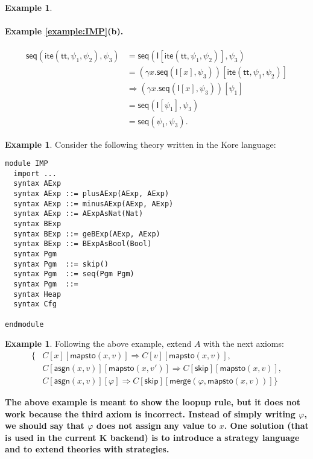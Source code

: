\documentclass[UTF8]{article}
\newcommand{\comment}[1]
    {\par {\bfseries \color{blue} #1 \par}} %
\newcounter{thmcounter}
\theoremstyle{plain}
\theoremstyle{definition}
\newtheorem{example}[thmcounter]{Example}
\theoremstyle{remark}
\newcommand{\impite}{\mathsf{ite}}
\newcommand{\imptt}{\mathsf{tt}}
\newcommand{\impskip}{\mathsf{skip}}
\newcommand{\impseq}{\mathsf{seq}}
\newcommand{\impasgn}{\mathsf{asgn}}
\newcommand{\impmapsto}{\mathsf{mapsto}}
\newcommand{\impmerge}{\mathsf{merge}}
\newcommand{\I}{\mathsf{I}}
\begin{document}
\begin{example}
\paragraph{Example \ref{example:IMP}(b).} 
	\begin{align*}
	\impseq(\impite(\imptt, \psi_1, \psi_2), \psi_3) 
	&= \impseq(\I[\impite(\imptt, \psi_1, \psi_2)], \psi_3) \\
	&= (\gamma x . \impseq(\I[x], \psi_3))[\impite(\imptt, \psi_1, \psi_2)] \\
	&\Rightarrow (\gamma x . \impseq(\I[x], \psi_3))[\psi_1] \\
	&= \impseq(\I[\psi_1], \psi_3) \\
	&= \impseq(\psi_1, \psi_3).
	\end{align*}
\end{example}

\begin{example}
Consider the following theory written in the Kore language:
\begin{Verbatim}
module IMP
  import ...
  syntax AExp
  syntax AExp ::= plusAExp(AExp, AExp)
  syntax AExp ::= minusAExp(AExp, AExp)
  syntax AExp ::= AExpAsNat(Nat)
  syntax BExp
  syntax BExp ::= geBExp(AExp, AExp)
  syntax BExp ::= BExpAsBool(Bool)
  syntax Pgm
  syntax Pgm  ::= skip()
  syntax Pgm  ::= seq(Pgm Pgm)
  syntax Pgm  ::= 
  syntax Heap
  syntax Cfg
  
endmodule
\end{Verbatim}

\end{example}


\begin{example}
Following the above example, extend $A$ with the next axioms:
\begin{align*}
  \{&C[x][\impmapsto(x, v)] \Rightarrow C[v][\impmapsto(x, v)], \\
    &C[\impasgn(x, v)][\impmapsto(x, v')] \Rightarrow C[\impskip][\impmapsto(x,v)], \\
    &C[\impasgn(x, v)][\varphi] \Rightarrow C[\impskip][\impmerge(\varphi, \impmapsto(x, v))]\}
\end{align*}
\end{example}
\comment{The above example is meant to show the loopup rule, but it does not work because the third axiom is incorrect. Instead of simply writing $\varphi$, we should say that $\varphi$ does not assign any value to $x$. One solution (that is used in the current K backend) is to introduce a strategy language and to extend theories with strategies. }
\end{document}
